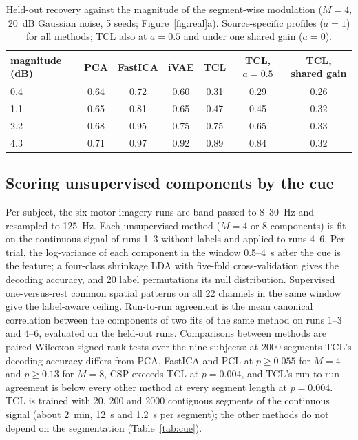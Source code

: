 \begin{table}[h]\centering\small
\caption{Held-out recovery against the magnitude of the segment-wise modulation ($M = 4$, 20~dB Gaussian noise, 5 seeds; Figure~\ref{fig:real}a). Source-specific profiles ($a = 1$) for all methods; TCL also at $a = 0.5$ and under one shared gain ($a = 0$).}
\label{tab:mag}
\begin{tabular}{lcccccc}\toprule
magnitude (dB) & PCA & FastICA & iVAE & TCL & TCL, $a = 0.5$ & TCL, shared gain \\ \midrule
0.4 & 0.64 & 0.72 & 0.60 & 0.31 & 0.29 & 0.26 \\
1.1 & 0.65 & 0.81 & 0.65 & 0.47 & 0.45 & 0.32 \\
2.2 & 0.68 & 0.95 & 0.75 & 0.75 & 0.65 & 0.33 \\
4.3 & 0.71 & 0.97 & 0.92 & 0.89 & 0.84 & 0.32 \\
\bottomrule\end{tabular}\end{table}

\subsection{Scoring unsupervised components by the cue}
\label{app:cue}
Per subject, the six motor-imagery runs are band-passed to 8--30~Hz and resampled to 125~Hz.
Each unsupervised method ($M = 4$ or $8$ components) is fit on the continuous signal of runs 1--3 without labels and applied to runs 4--6.
Per trial, the log-variance of each component in the window 0.5--4~s after the cue is the feature; a four-class shrinkage LDA with five-fold cross-validation gives the decoding accuracy, and 20 label permutations its null distribution.
Supervised one-versus-rest common spatial patterns on all 22 channels in the same window give the label-aware ceiling.
Run-to-run agreement is the mean canonical correlation between the components of two fits of the same method on runs 1--3 and 4--6, evaluated on the held-out runs.
Comparisons between methods are paired Wilcoxon signed-rank tests over the nine subjects: at 2000 segments TCL's decoding accuracy differs from PCA, FastICA and PCL at $p \ge 0.055$ for $M = 4$ and $p \ge 0.13$ for $M = 8$, CSP exceeds TCL at $p = 0.004$, and TCL's run-to-run agreement is below every other method at every segment length at $p = 0.004$.
TCL is trained with 20, 200 and 2000 contiguous segments of the continuous signal (about 2~min, 12~s and 1.2~s per segment); the other methods do not depend on the segmentation (Table~\ref{tab:cue}).


